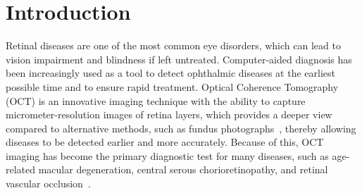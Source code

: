 \documentclass[runningheads]{llncs}
\newcommand{\xmli}[1]{{\color{red}{[XM: #1]}}}
\begin{document}
\section{Introduction}
Retinal diseases are one of the most common eye disorders, which can lead to vision impairment and blindness if left untreated. 
Computer-aided diagnosis has been increasingly used as a tool to detect ophthalmic diseases at the earliest possible time and to ensure rapid treatment. 
Optical Coherence Tomography (OCT) \cite{huang1991optical} is an innovative imaging technique with the ability to capture micrometer-resolution images of retina layers, which provides a deeper view compared to alternative methods, such as fundus photographs~\cite{muller2019ophthalmic}, thereby allowing diseases to be detected earlier and more accurately. 
Because of this, OCT imaging has become the primary diagnostic test for many diseases, such as age-related macular degeneration, central serous chorioretinopathy, and retinal vascular occlusion~\cite{ehlers2019retina}.


\end{document}
